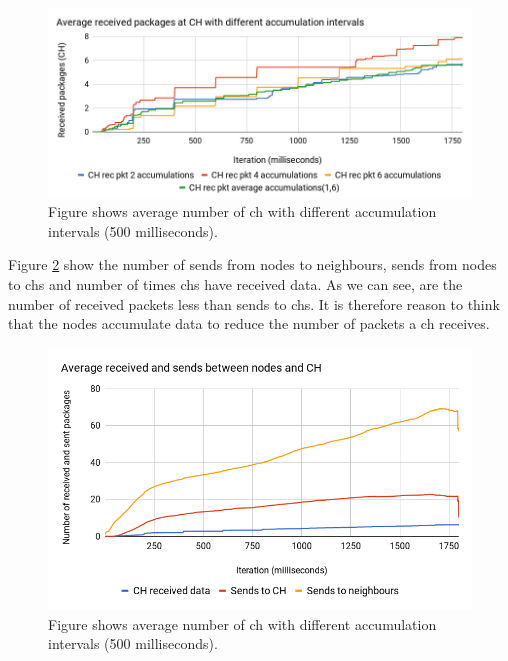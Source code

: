 \documentclass[USenglish]{uit-thesis}
\begin{document}
\begin{figure} [ht]
\centering
\includegraphics[width=\textwidth]{recPktChart.png}
\caption{Figure shows average number of \gls{ch} with different accumulation intervals (500 milliseconds).}
\label{fig:recPktChart}
\end{figure}



Figure \ref{fig:sentvsrecvChart} show the number of sends from nodes to neighbours, sends from nodes to \gls{ch}s and number of times \gls{ch}s have received data. As we can see, are the number of received packets less than sends to \glspl{ch}. It is therefore reason to think that the nodes accumulate data to reduce the number of packets a \gls{ch} receives.


\begin{figure} [ht]
\centering
\includegraphics[width=\textwidth]{sentVsRecvChart.png}
\caption{Figure shows average number of \gls{ch} with different accumulation intervals (500 milliseconds).}
\label{fig:sentvsrecvChart}
\end{figure}
\end{document}
